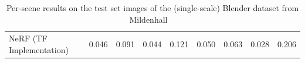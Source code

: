 \documentclass[10pt,twocolumn,letterpaper]{article}
\begin{document}
\begin{table}[]
\begin{tabular}{l|cccccccc}
NeRF (TF Implementation)~\cite{mildenhall2020}                    &                    0.046  &                    0.091  &                    0.044  &                    0.121  &                    0.050  &                    0.063  &                    0.028  &                    0.206  \\

    \end{tabular}
    \caption{Per-scene results on the test set images of the (single-scale) Blender dataset from Mildenhall~\etal~\cite{mildenhall2020}}
    \label{tab:blender_results}
\end{table}
\end{document}
